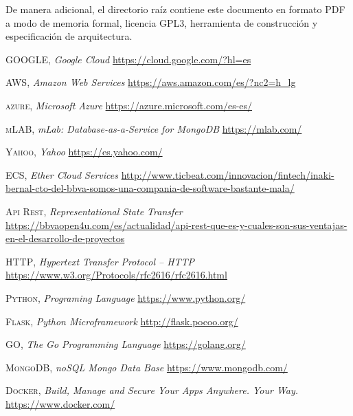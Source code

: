 \documentclass[a4paper,11pt]{book}
\begin{document}
De manera adicional, el directorio raíz contiene este documento en formato PDF a modo de memoria formal, licencia GPL3, herramienta de construcción y especificación de arquitectura. 

 
\begin{thebibliography}{aaaa}


 \textsc{GOOGLE},
\textit{Google Cloud}
\url{https://cloud.google.com/?hl=es} 



 \textsc{AWS},
\textit{Amazon Web Services}
\url{https://aws.amazon.com/es/?nc2=h_lg} 


 \textsc{azure},
\textit{Microsoft Azure}
\url{https://azure.microsoft.com/es-es/} 


 \textsc{mLAB},
\textit{mLab: Database-as-a-Service for MongoDB}
\url{https://mlab.com/} 

 \textsc{Yahoo},
\textit{Yahoo}
\url{https://es.yahoo.com/} 

 \textsc{ECS},
\textit{Ether Cloud Services}
\url{http://www.ticbeat.com/innovacion/fintech/inaki-bernal-cto-del-bbva-somos-una-compania-de-software-bastante-mala/} 

 \textsc{Api Rest},
\textit{Representational State Transfer}
\url{https://bbvaopen4u.com/es/actualidad/api-rest-que-es-y-cuales-son-sus-ventajas-en-el-desarrollo-de-proyectos} 

 \textsc{HTTP},
\textit{Hypertext Transfer Protocol -- HTTP}
\url{https://www.w3.org/Protocols/rfc2616/rfc2616.html}

 \textsc{Python},
\textit{Programing Language}
\url{https://www.python.org/}


 \textsc{Flask},
\textit{Python Microframework }
\url{http://flask.pocoo.org/}

 \textsc{GO},
\textit{The Go Programming Language}
\url{https://golang.org/}


 \textsc{MongoDB},
\textit{noSQL Mongo Data Base}
\url{https://www.mongodb.com/}

 \textsc{Docker},
\textit{Build, Manage and Secure Your Apps Anywhere. Your Way.}
\url{https://www.docker.com/}


\end{thebibliography}
 


%
%
%
%

%
%

\thispagestyle{empty}
\end{document}
